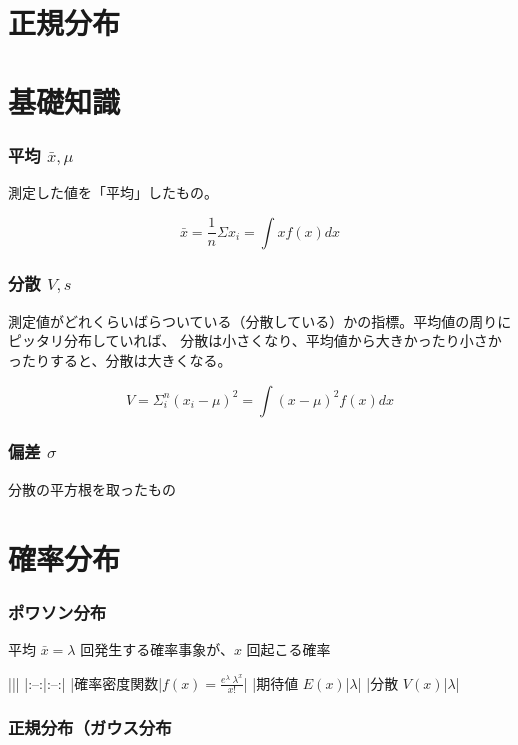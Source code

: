 \documentclass[uplatex]{jsarticle}
\begin{document}
\section{正規分布}

\section{基礎知識}

\subsubsection{平均 $\bar{x}, \mu$}
測定した値を「平均」したもの。

\begin{equation}
  \bar{x}=\frac{1}{n}\Sigma x_i = \int xf(x)dx
\end{equation}

\subsubsection{分散 $V, s$}
測定値がどれくらいばらついている（分散している）かの指標。平均値の周りにピッタリ分布していれば、
分散は小さくなり、平均値から大きかったり小さかったりすると、分散は大きくなる。

\begin{equation}
  V=\Sigma_i^{n} (x_{i}-\mu)^{2} = \int (x-\mu)^2f(x)dx
\end{equation}

\subsubsection{偏差 $\sigma$}
分散の平方根を取ったもの

\section{確率分布}
\subsubsection{ポワソン分布}
平均 $\bar{x}=\lambda$ 回発生する確率事象が、$x$ 回起こる確率

|||
|:--:|:--:|
|確率密度関数|$f(x)=\frac{e^{\lambda}~\lambda^{x}}{x!}$|
|期待値 $E(x)$|$\lambda$|
|分散 $V(x)$|$\lambda$|


\subsubsection{正規分布（ガウス分布}
\end{document}
